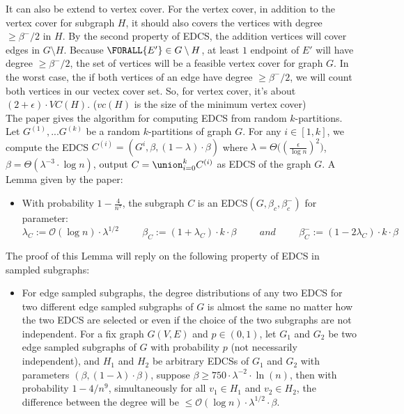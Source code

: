 \documentclass[12pt]{report}
\begin{document}
{It can also be extend to vertex cover. For the vertex cover, in addition to the vertex cover for subgraph $H$, it should also covers the vertices with degree $\geq \beta^-/2$ in $H$. By the second property of EDCS, the addition vertices will cover edges in $G \setminus H$. Because $\FORALL{E'} \in G \setminus H$, at least $1$ endpoint of $E'$ will have degree $\geq \beta^-/2$, the set of vertices will be a feasible vertex cover for graph $G$. In the worst case, the if both vertices of an edge have degree $\geq \beta^-/2$, we will count both vertices in our vectex cover set. So, for vertex cover, it's about $(2 + \epsilon)\cdot VC(H)$. ($vc(H)$ is the size of the minimum vertex cover)\\

The paper gives the algorithm for computing EDCS from random $k$-partitions. Let $G^{(1)},...G^{(k)}$ be a random $k$-partitions of graph $G$. For any $i \in [1,k]$, we compute the EDCS $C^{(i)} = (G^{i}, \beta,(1-\lambda)\cdot\beta)$ where $\lambda = \Theta  \bigg((\frac{\epsilon}{\log {n}})^2 \bigg)$, $ \beta = \Theta(\lambda^{-3}\cdot\log{n})$, output $C = \union_{i=0}^{k} C^{(i)}$ as EDCS of the graph $G$. A Lemma given by the paper:  

\begin{itemize}
    \item With probability $1 - \frac{4}{n^7}$, the subgraph $C$ is an EDCS$(G,\beta_c,\beta_c^-)$ for parameter:
    $$ \lambda_C := \mathcal{O}(\log {n})\cdot\lambda^{1/2} \hspace{1cm} \beta_C := (1 + \lambda_C)\cdot k\cdot\beta \hspace{1cm} and \hspace{1cm} \beta_C^- := (1-2\lambda_C)\cdot k\cdot\beta$$
\end{itemize}

The proof of this Lemma will reply on the following property of EDCS in sampled subgraphs:

\begin{itemize}
    \item For edge sampled subgraphs, the degree distributions
    of any two EDCS for two different edge sampled subgraphs of $G$ is almost the same no matter how the two EDCS are selected or even if the choice of the two subgraphs are not independent. For a fix graph $G(V,E)$ and $p \in (0,1)$, let $G_1$ and $G_2$ be two edge sampled subgraphs of $G$ with probability $p$ (not necessarily independent), and $H_1$ and $H_2$ be arbitrary EDCSs of $G_1$ and $G_2$ with parameters $(\beta , (1-\lambda)\cdot\beta)$, suppose $\beta \geq 750 \cdot \lambda^{-2}\cdot \ln {(n)}$, then with probability $1 - 4/n^9$, simultaneously for all $v_1 \in H_1$ and $v_2 \in H_2$, the difference between the degree will be $\leq \mathcal{O}(\log {n}) \cdot \lambda^{1/2} \cdot \beta$.


\end{itemize}}
\end{document}
